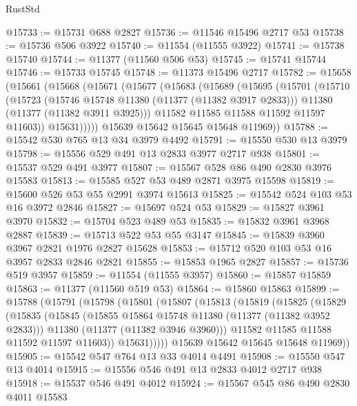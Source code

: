 \begin{lexlean}{RustStd}
\begin{coremodule}
{\begin{coremodule}
{{{{{{{{{{{{{{{{{{{{{{{{{{{{{{{{{@15733 := @15731 @688 @2827
@15736 := @11546 @15496 @2717 @53
@15738 := @15736 @506 @3922
@15740 := @11554 (@11555 @3922)
@15741 := @15738 @15740
@15744 := @11377 (@11560 @506 @53)
@15745 := @15741 @15744
@15746 := @15733 @15745
@15748 := @11373 @15496 @2717
@15782 := @15658
    (@15661
      (@15668
        (@15671
          (@15677
            (@15683
              (@15689
                (@15695
                  (@15701
                    (@15710
                      (@15723
                        (@15746 @15748 @11380 (@11377 (@11382 @3917 @2833)))
                        @11380
                        (@11377 (@11382 @3911 @3925)))
                      @11582
                      @11585
                      @11588
                      @11592
                      @11597
                      @11603))
                  @15631)))))
        @15639
        @15642
        @15645
        @15648
        @11969))
@15788 := @15542 @530 @765 @13 @34 @3979 @4492
@15791 := @15550 @530 @13 @3979
@15798 := @15556 @529 @491 @13 @2833 @3977 @2717 @938
@15801 := @15537 @529 @491 @3977
@15807 := @15567 @528 @86 @490 @2830 @3976 @15583
@15813 := @15585 @527 @53 @489 @2871 @3975 @15598
@15819 := @15600 @526 @53 @55 @2991 @3974 @15613
@15825 := @15542 @524 @103 @53 @16 @3972 @2846
@15827 := @15697 @524 @53
@15829 := @15827 @3961 @3970
@15832 := @15704 @523 @489 @53
@15835 := @15832 @3961 @3968 @2887
@15839 := @15713 @522 @53 @55 @3147
@15845 := @15839 @3960 @3967 @2821 @1976 @2827 @15628
@15853 := @15712 @520 @103 @53 @16 @3957 @2833 @2846 @2821
@15855 := @15853 @1965 @2827
@15857 := @15736 @519 @3957
@15859 := @11554 (@11555 @3957)
@15860 := @15857 @15859
@15863 := @11377 (@11560 @519 @53)
@15864 := @15860 @15863
@15899 := @15788
    (@15791
      (@15798
        (@15801
          (@15807
            (@15813
              (@15819
                (@15825
                  (@15829
                    (@15835
                      (@15845
                        (@15855 @15864 @15748 @11380 (@11377 (@11382 @3952 @2833)))
                        @11380
                        (@11377 (@11382 @3946 @3960)))
                      @11582
                      @11585
                      @11588
                      @11592
                      @11597
                      @11603))
                  @15631)))))
        @15639
        @15642
        @15645
        @15648
        @11969))
@15905 := @15542 @547 @764 @13 @33 @4014 @4491
@15908 := @15550 @547 @13 @4014
@15915 := @15556 @546 @491 @13 @2833 @4012 @2717 @938
@15918 := @15537 @546 @491 @4012
@15924 := @15567 @545 @86 @490 @2830 @4011 @15583
}}}}}}}}}}}}}}}}}}}}}}}}}}}}}}}}}
\end{coremodule}}
\end{coremodule}
\end{lexlean}
